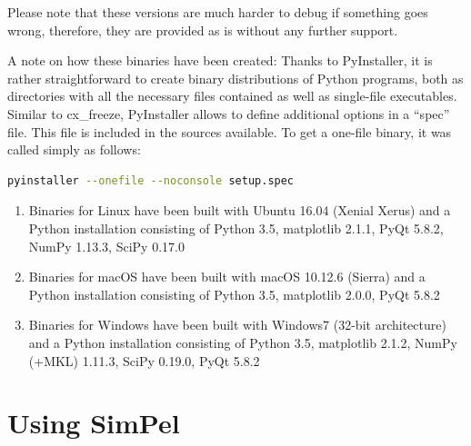 \documentclass[pdftex,bezier,german,a4,twoside, headexclude,12pt,nochapterprefix, titlepage]{extarticle}
\newcommand{\simpel}{\textsf{SimPel}}
\begin{document}
Please note that these versions are much harder to debug if something goes wrong, therefore, they are provided as is without any further support. 



A note on how these binaries have been created: Thanks to PyInstaller, it is rather straightforward to create binary distributions
of Python programs, both as directories with all the necessary files contained as well as single-file executables. 
Similar to cx\_freeze, PyInstaller allows to define additional options in a “spec” file. 
This file is included in the sources available. To get a one-file binary, it was called simply as follows:\\
\begin{lstlisting}[language=bash]
  pyinstaller --onefile --noconsole setup.spec
\end{lstlisting}
\begin{enumerate}
\item Binaries for Linux have been built with Ubuntu 16.04 (Xenial Xerus) and a Python installation consisting of Python 3.5, matplotlib 2.1.1, PyQt 5.8.2,  NumPy 1.13.3, SciPy 0.17.0
\item  Binaries for macOS have been built with macOS 10.12.6 (Sierra) and a Python installation consisting of Python 3.5, matplotlib 2.0.0, PyQt 5.8.2
 \item  Binaries for Windows have been built with Windows7 (32-bit architecture) and a Python installation consisting of Python 3.5, matplotlib 2.1.2, NumPy (+MKL) 1.11.3, SciPy 0.19.0, PyQt 5.8.2
\end{enumerate}


\newpage
\section{Using \simpel}
\FloatBarrier
\end{document}
